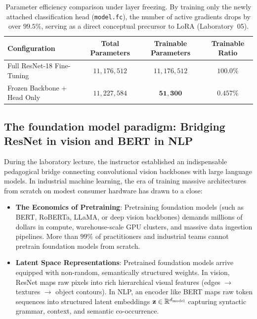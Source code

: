 \documentclass[../labs.tex]{subfiles}
\begin{document}
\begin{table}[htbp]
\centering
\small
\begin{tabularx}{\textwidth}{>{\raggedright\arraybackslash}X c c c}
\toprule
\textbf{Configuration} & \textbf{Total Parameters} & \textbf{Trainable Parameters} & \textbf{Trainable Ratio} \\
\midrule
Full ResNet-18 Fine-Tuning & $11{,}176{,}512$ & $11{,}176{,}512$ & $100.0\%$ \\
Frozen Backbone + Head Only & $11{,}227{,}584$ & $\mathbf{51{,}300}$ & $\mathbf{0.457\%}$ \\
\bottomrule
\end{tabularx}
\caption{Parameter efficiency comparison under layer freezing. By training only the newly attached classification head (\texttt{model.fc}), the number of active gradients drops by over $99.5\%$, serving as a direct conceptual precursor to LoRA (Laboratory~05).}
\label{tab:parameter_freezing}
\end{table}

\subsection{The foundation model paradigm: Bridging ResNet in vision and BERT in NLP}
During the laboratory lecture, the instructor established an indispensable pedagogical bridge connecting convolutional vision backbones with large language models. In industrial machine learning, the era of training massive architectures from scratch on modest consumer hardware has drawn to a close:
\begin{itemize}
    \item \textbf{The Economics of Pretraining}: Pretraining foundation models (such as BERT, RoBERTa, LLaMA, or deep vision backbones) demands millions of dollars in compute, warehouse-scale GPU clusters, and massive data ingestion pipelines. More than $99\%$ of practitioners and industrial teams cannot pretrain foundation models from scratch.
    \item \textbf{Latent Space Representations}: Pretrained foundation models arrive equipped with non-random, semantically structured weights. In vision, ResNet maps raw pixels into rich hierarchical visual features (edges $\to$ textures $\to$ object contours). In NLP, an encoder like BERT maps raw token sequences into structured latent embeddings $\mathbf{z} \in \mathbb{R}^{d_{\text{model}}}$ capturing syntactic grammar, context, and semantic co-occurrence.
\end{itemize}
\end{document}
